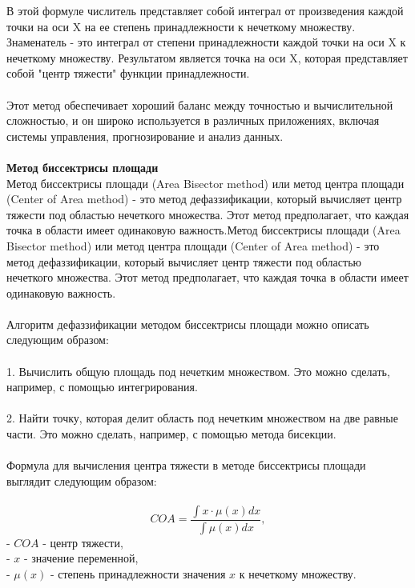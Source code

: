 \documentclass{article}
\begin{document}
    В этой формуле числитель представляет собой интеграл от произведения каждой точки на оси X на ее степень принадлежности к нечеткому множеству. Знаменатель - это интеграл от степени принадлежности каждой точки на оси X к нечеткому множеству. Результатом является точка на оси X, которая представляет собой "{}центр тяжести"{} функции принадлежности.\\
    ~\\
    Этот метод обеспечивает хороший баланс между точностью и вычислительной сложностью, и он широко используется в различных приложениях, включая системы управления, прогнозирование и анализ данных.\\
    ~\\
    \textbf{Метод биссектрисы площади}\\
    Метод биссектрисы площади (Area Bisector method) или метод центра площади (Center of Area method) - это метод дефаззификации, который вычисляет центр тяжести под областью нечеткого множества. Этот метод предполагает, что каждая точка в области имеет одинаковую важность.Метод биссектрисы площади (Area Bisector method) или метод центра площади (Center of Area method) - это метод дефаззификации, который вычисляет центр тяжести под областью нечеткого множества. Этот метод предполагает, что каждая точка в области имеет одинаковую важность.\\
    ~\\
    Алгоритм дефаззификации методом биссектрисы площади можно описать следующим образом:\\
    ~\\
    1. Вычислить общую площадь под нечетким множеством. Это можно сделать, например, с помощью интегрирования.\\
    ~\\
    2. Найти точку, которая делит область под нечетким множеством на две равные части. Это можно сделать, например, с помощью метода бисекции.\\
    ~\\
    Формула для вычисления центра тяжести в методе биссектрисы площади выглядит следующим образом:\\
    ~\\
    \[
        COA = \frac{\int x \cdot \mu(x) dx}{\int \mu(x) dx},
    \]
    - \(COA\) - центр тяжести,\\
    - \(x\) - значение переменной,\\
    - \(\mu(x)\) - степень принадлежности значения \(x\) к нечеткому множеству.\\
    ~\\
\end{document}

